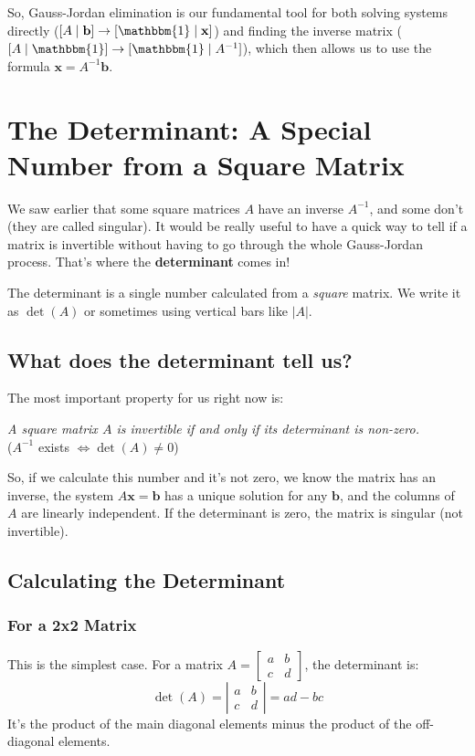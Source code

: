 \documentclass[11pt]{article}
\newcommand{\x}{\mathbf{x}}
\newcommand{\bb}{\mathbf{b}}
\newcommand{\id}{\mathbbm{1}}
\begin{document}
So, Gauss-Jordan elimination is our fundamental tool for both solving systems directly ($[A \mid \bb] \to [\id \mid \x]$) and finding the inverse matrix ($[A \mid \id] \to [\id \mid A^{-1}]$), which then allows us to use the formula $\x = A^{-1}\bb$.


\section{The Determinant: A Special Number from a Square Matrix}

We saw earlier that some square matrices $A$ have an inverse $A^{-1}$, and some don't (they are called singular). It would be really useful to have a quick way to tell if a matrix is invertible without having to go through the whole Gauss-Jordan process. That's where the \textbf{determinant} comes in!

The determinant is a single number calculated from a \textit{square} matrix. We write it as $\det(A)$ or sometimes using vertical bars like $|A|$.

\subsection{What does the determinant tell us?}

The most important property for us right now is:

\begin{center}
\textit{A square matrix $A$ is invertible if and only if its determinant is non-zero.} \\
($A^{-1}$ exists $\iff \det(A) \neq 0$)
\end{center}

So, if we calculate this number and it's not zero, we know the matrix has an inverse, the system $A\x = \bb$ has a unique solution for any $\bb$, and the columns of $A$ are linearly independent. If the determinant is zero, the matrix is singular (not invertible).

\subsection{Calculating the Determinant}

\subsubsection{For a 2x2 Matrix}
This is the simplest case. For a matrix $A = \begin{bmatrix} a & b \\ c & d \end{bmatrix}$, the determinant is:
\[ \det(A) = \left| \begin{matrix} a & b \\ c & d \end{matrix} \right| = ad - bc \]
It's the product of the main diagonal elements minus the product of the off-diagonal elements.
\end{document}
